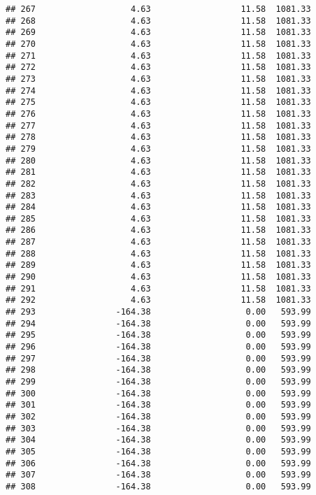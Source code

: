 \documentclass[]{article}
\begin{document}
\begin{verbatim}
## 267                   4.63                  11.58  1081.33
## 268                   4.63                  11.58  1081.33
## 269                   4.63                  11.58  1081.33
## 270                   4.63                  11.58  1081.33
## 271                   4.63                  11.58  1081.33
## 272                   4.63                  11.58  1081.33
## 273                   4.63                  11.58  1081.33
## 274                   4.63                  11.58  1081.33
## 275                   4.63                  11.58  1081.33
## 276                   4.63                  11.58  1081.33
## 277                   4.63                  11.58  1081.33
## 278                   4.63                  11.58  1081.33
## 279                   4.63                  11.58  1081.33
## 280                   4.63                  11.58  1081.33
## 281                   4.63                  11.58  1081.33
## 282                   4.63                  11.58  1081.33
## 283                   4.63                  11.58  1081.33
## 284                   4.63                  11.58  1081.33
## 285                   4.63                  11.58  1081.33
## 286                   4.63                  11.58  1081.33
## 287                   4.63                  11.58  1081.33
## 288                   4.63                  11.58  1081.33
## 289                   4.63                  11.58  1081.33
## 290                   4.63                  11.58  1081.33
## 291                   4.63                  11.58  1081.33
## 292                   4.63                  11.58  1081.33
## 293                -164.38                   0.00   593.99
## 294                -164.38                   0.00   593.99
## 295                -164.38                   0.00   593.99
## 296                -164.38                   0.00   593.99
## 297                -164.38                   0.00   593.99
## 298                -164.38                   0.00   593.99
## 299                -164.38                   0.00   593.99
## 300                -164.38                   0.00   593.99
## 301                -164.38                   0.00   593.99
## 302                -164.38                   0.00   593.99
## 303                -164.38                   0.00   593.99
## 304                -164.38                   0.00   593.99
## 305                -164.38                   0.00   593.99
## 306                -164.38                   0.00   593.99
## 307                -164.38                   0.00   593.99
## 308                -164.38                   0.00   593.99

\end{verbatim}
\end{document}
